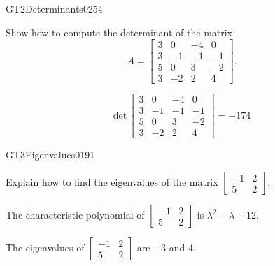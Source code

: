\begin{exercise}{GT2}{Determinants}{0254} 
\begin{exerciseStatement} 

Show how to compute the determinant of the matrix \[A=\left[\begin{array}{cccc}
3 & 0 & -4 & 0 \\
3 & -1 & -1 & -1 \\
5 & 0 & 3 & -2 \\
3 & -2 & 2 & 4
\end{array}\right].\]

 \end{exerciseStatement}
 \begin{exerciseAnswer} \[\mathrm{det}\,\left[\begin{array}{cccc}
3 & 0 & -4 & 0 \\
3 & -1 & -1 & -1 \\
5 & 0 & 3 & -2 \\
3 & -2 & 2 & 4
\end{array}\right]=-174\] \end{exerciseAnswer}
 \end{exercise}



\begin{exercise}{GT3}{Eigenvalues}{0191} 
\begin{exerciseStatement} 

Explain how to find the eigenvalues of the matrix \(\left[\begin{array}{cc}
-1 & 2 \\
5 & 2
\end{array}\right]\).

 \end{exerciseStatement}
 \begin{exerciseAnswer} 

The characteristic polynomial of \(\left[\begin{array}{cc}
-1 & 2 \\
5 & 2
\end{array}\right]\) is \(\lambda^{2} - \lambda - 12\).

 

The eigenvalues of \(\left[\begin{array}{cc}
-1 & 2 \\
5 & 2
\end{array}\right]\) are \(-3\) and \(4\).

 \end{exerciseAnswer}
 \end{exercise}



